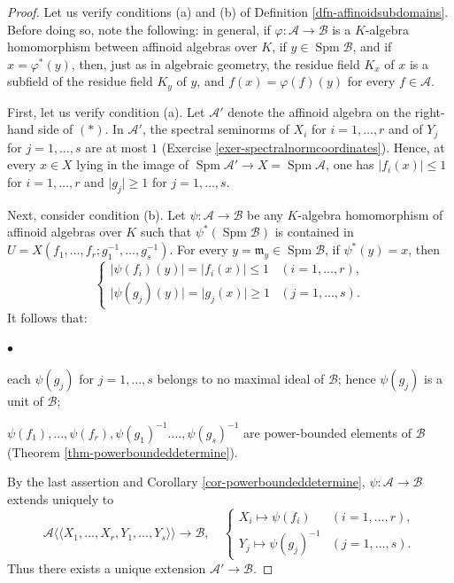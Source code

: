 \documentclass[a4paper,12pt, dvipdfmx]{jsbook}
\def\m{\mathfrak{m}}
\def\Spm{\mathop{\mathrm{Spm}}\nolimits}
\def\dl{\langle\!\langle}
\def\dr{\rangle\!\rangle}
\newcommand{\abs}[1]{\lvert#1\rvert}
\renewenvironment{itemize}%
{%
   \begin{list}{\parbox{1zw}{$\bullet$}}%
   {%
      \setlength{\topsep}{.5zh}
      \setlength{\itemindent}{0zw}
      \setlength{\leftmargin}{3zw}%
      \setlength{\rightmargin}{0zw}%
      \setlength{\labelsep}{.5zw}%
      \setlength{\labelwidth}{3zw}%
      \setlength{\itemsep}{0.2em}%
      \setlength{\parsep}{0em}%
      \setlength{\listparindent}{0zw}%
   }
}{%
   \end{list}%
}
\theoremstyle{plain}
\theoremstyle{definition}
\begin{document}
\begin{proof}[Proof]
Let us verify conditions (a) and (b) of Definition \ref{dfn-affinoidsubdomains}.
Before doing so, note the following: in general, if $\varphi\colon\mathcal{A}\rightarrow\mathcal{B}$ is a $K$-algebra homomorphism between affinoid algebras over $K$, if $y\in\Spm\mathcal{B}$, and if $x=\varphi^{\ast}(y)$, then, just as in algebraic geometry, the residue field $K_x$ of $x$ is a subfield of the residue field $K_y$ of $y$, and $f(x)=\varphi(f)(y)$ for every $f\in\mathcal{A}$.

First, let us verify condition (a). Let $\mathcal{A}'$ denote the affinoid algebra on the right-hand side of $(\ast)$.
In $\mathcal{A}'$, the spectral seminorms of $X_i$ for $i=1,\ldots,r$ and of $Y_j$ for $j=1,\ldots,s$ are at most $1$ (Exercise \ref{exer-spectralnormcoordinates}).
Hence, at every $x\in X$ lying in the image of $\Spm\mathcal{A}'\rightarrow X=\Spm\mathcal{A}$, one has $\abs{f_i(x)}\leq 1$ for $i=1,\ldots,r$ and $\abs{g_j}\geq 1$ for $j=1,\ldots,s$.

Next, consider condition (b). Let $\psi\colon\mathcal{A}\rightarrow\mathcal{B}$ be any $K$-algebra homomorphism of affinoid algebras over $K$ such that $\psi^{\ast}(\Spm\mathcal{B})$ is contained in $U=X(f_1,\ldots,f_r;g^{-1}_1,\ldots,g^{-1}_s)$.
For every $y=\m_y\in\Spm\mathcal{B}$, if $\psi^{\ast}(y)=x$, then
$$
\begin{cases}
\abs{\psi(f_i)(y)}=\abs{f_i(x)}\leq 1&(i=1,\ldots,r),\\
\abs{\psi(g_j)(y)}=\abs{g_j(x)}\geq 1&(j=1,\ldots,s).
\end{cases}
$$
It follows that:
\begin{itemize}
\item each $\psi(g_j)$ for $j=1,\ldots,s$ belongs to no maximal ideal of $\mathcal{B}$; hence $\psi(g_j)$ is a unit of $\mathcal{B}$;
\item $\psi(f_1),\ldots,\psi(f_r),\psi(g_1)^{-1}.\ldots,\psi(g_s)^{-1}$ are power-bounded elements of $\mathcal{B}$ (Theorem \ref{thm-powerboundeddetermine}).
\end{itemize}
By the last assertion and Corollary \ref{cor-powerboundeddetermine}, $\psi\colon\mathcal{A}\rightarrow\mathcal{B}$ extends uniquely to
$$
\mathcal{A}\dl X_1,\ldots,X_r,Y_1,\ldots,Y_s\dr\longrightarrow\mathcal{B},\quad
\begin{cases}
 X_i\longmapsto\psi(f_i)&(i=1,\ldots,r),\\
 Y_j\longmapsto\psi(g_j)^{-1}&(j=1,\ldots,s).
\end{cases}
$$
Thus there exists a unique extension $\mathcal{A}'\rightarrow\mathcal{B}$.
\end{proof}
\end{document}
